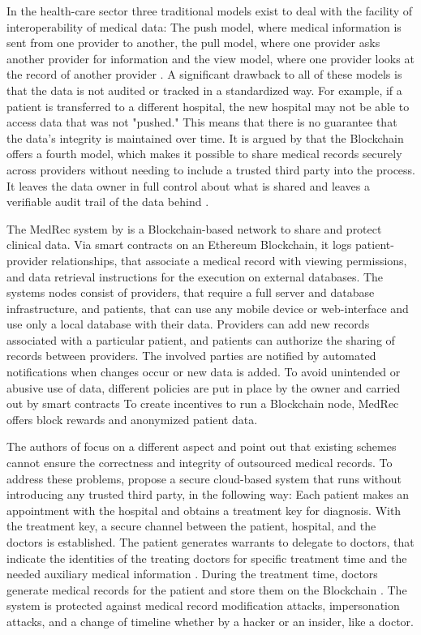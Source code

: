 In the health-care sector three traditional models exist to deal with the facility of interoperability of medical data: The push model, where medical information is sent from one provider to another, the pull model, where one provider asks another provider for information and the view model, where one provider looks at the record of another provider \cite{Kshetri2017}.
A significant drawback to all of these models is that the data is not audited or tracked in a standardized way. For example, if a patient is transferred to a different hospital, the new hospital may not be able to access data that was not "pushed." This means that there is no guarantee that the data's integrity is maintained over time.
It is argued by \cite{Kshetri2017} that the Blockchain offers a fourth model, which makes it possible to share medical records securely across providers without needing to include a trusted third party into the process. It leaves the data owner in full control about what is shared and leaves a verifiable audit trail of the data behind \cite{Kshetri2017}.

The MedRec system by \cite{Azaria2016} is a Blockchain-based network to share and protect clinical data. Via smart contracts on an Ethereum Blockchain, it logs patient-provider relationships, that associate a medical record with viewing permissions, and data retrieval instructions for the execution on external databases.
The systems nodes consist of providers, that require a full server and database infrastructure, and patients, that can use any mobile device or web-interface and use only a local database with their data.
Providers can add new records associated with a particular patient, and patients can authorize the sharing of records between providers. The involved parties are notified by automated notifications when changes occur or new data is added. To avoid unintended or abusive use of data, different policies are put in place by the owner and carried out by smart contracts
To create incentives to run a Blockchain node, MedRec offers block rewards and anonymized patient data.

The authors of\cite{Cao2019} focus on a different aspect and point out that existing schemes cannot ensure the correctness and integrity of outsourced medical records.
To address these problems, \cite{Cao2019} propose a secure cloud-based system that runs without introducing any trusted third party, in the following way:
 Each patient makes an appointment with the hospital and obtains a treatment key for diagnosis. With the treatment key, a secure channel between the patient, hospital, and the doctors is established.
The patient generates warrants to delegate to doctors, that indicate the identities of the treating doctors for specific treatment time and the needed auxiliary medical information \cite{Cao2019}.
During the treatment time, doctors generate medical records for the patient and store them on the Blockchain \cite{Cao2019}.
The system is protected against medical record modification attacks, impersonation attacks, and a change of timeline whether by a hacker or an insider, like a doctor.

